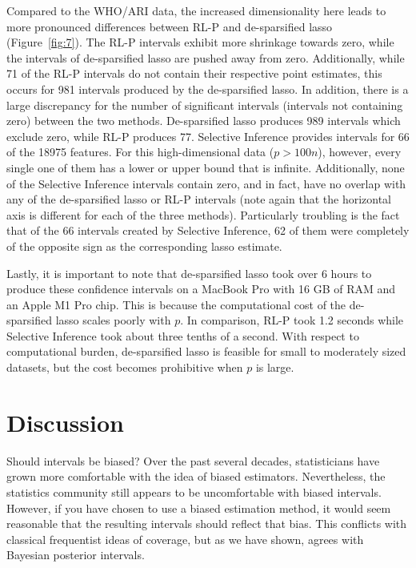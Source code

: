Compared to the WHO/ARI data, the increased dimensionality here leads to more pronounced differences between RL-P and de-sparsified lasso (Figure~\ref{fig:7}). The RL-P intervals exhibit more shrinkage towards zero, while the intervals of de-sparsified lasso are pushed away from zero. Additionally, while 71 of the RL-P intervals do not contain their respective point estimates, this occurs for 981 intervals produced by the de-sparsified lasso. In addition, there is a large discrepancy for the number of significant intervals (intervals not containing zero) between the two methods. De-sparsified lasso produces 989 intervals which exclude zero, while RL-P produces 77. Selective Inference provides intervals for 66 of the 18975 features. For this high-dimensional data ($p > 100n$), however, every single one of them has a lower or upper bound that is infinite. Additionally, none of the Selective Inference intervals contain zero, and in fact, have no overlap with any of the de-sparsified lasso or RL-P intervals (note again that the horizontal axis is different for each of the three methods). Particularly troubling is the fact that of the 66 intervals created by Selective Inference, 62 of them were completely of the opposite sign as the corresponding lasso estimate.

Lastly, it is important to note that de-sparsified lasso took over 6 hours to produce these confidence intervals on a MacBook Pro with 16 GB of RAM and an Apple M1 Pro chip. This is because the computational cost of the de-sparsified lasso scales poorly with $p$. In comparison, RL-P took 1.2 seconds while Selective Inference took about three tenths of a second. With respect to computational burden, de-sparsified lasso is feasible for small to moderately sized datasets, but the cost becomes prohibitive when $p$ is large.

\section{Discussion} \label{Sec:discussion}

Should intervals be biased? Over the past several decades, statisticians have grown more comfortable with the idea of biased estimators. Nevertheless, the statistics community still appears to be uncomfortable with biased intervals. However, if you have chosen to use a biased estimation method, it would seem reasonable that the resulting intervals should reflect that bias. This conflicts with classical frequentist ideas of coverage, but as we have shown, agrees with Bayesian posterior intervals.

